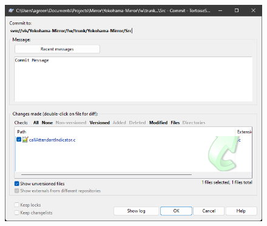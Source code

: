 \documentclass[10pt]{article}
\begin{document}
                \begin{figure}[H]
                    \centerline{\includegraphics[width=\textwidth]{References/SVN Commit Window.png}}
                \end{figure}
\end{document}
